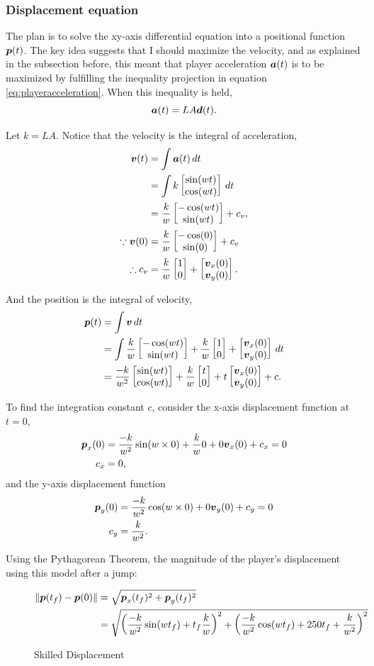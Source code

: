 \subsubsection{Displacement equation}
The plan is to solve the xy-axis differential equation into a positional function $\boldsymbol{p}(t)$. The key idea suggests that I should maximize the velocity, and as explained in the subsection before, this meant that player acceleration $\boldsymbol{a}(t)$ is to be maximized by fulfilling the inequality projection in equation \ref{eq:playeracceleration}. When this inequality is held,
\[
    \boldsymbol{a}(t) = LA\boldsymbol{d}(t).
\]

Let $k=LA$. Notice that the velocity is the integral of acceleration,
\begin{align*}
    \boldsymbol{v}(t) &= \int \boldsymbol{a}(t) \, dt\\
    &= \int k \begin{bmatrix}\sin(wt)\\\cos(wt)\end{bmatrix} \, dt\\
    &= \frac{k}{w} \begin{bmatrix}-\cos(wt)\\\sin(wt)\end{bmatrix} + c_v,\\
    \because \boldsymbol{v}(0) &= \frac{k}{w} \begin{bmatrix}-\cos(0)\\\sin(0)\end{bmatrix} + c_v\\
    \therefore c_v &= \frac{k}{w} \begin{bmatrix}1\\0\end{bmatrix} + \begin{bmatrix}\boldsymbol{v}_x(0)\\\boldsymbol{v}_y(0)\end{bmatrix}.
\end{align*}

And the position is the integral of velocity,
\begin{align*}
    \boldsymbol{p}(t) &= \int \boldsymbol{v} \, dt\\
    &= \int \frac{k}{w} \begin{bmatrix}-\cos(wt)\\\sin(wt)\end{bmatrix} + \frac{k}{w}\begin{bmatrix}1\\0\end{bmatrix} + \begin{bmatrix}\boldsymbol{v}_x(0)\\\boldsymbol{v}_y(0)\end{bmatrix} \, dt\\
    &= \frac{-k}{w^2} \begin{bmatrix}\sin(wt)\\\cos(wt)\end{bmatrix} + \frac{k}{w}\begin{bmatrix}t\\0\end{bmatrix}  + t\begin{bmatrix}\boldsymbol{v}_x(0)\\\boldsymbol{v}_y(0)\end{bmatrix} + c.
\end{align*}

To find the integration constant $c$, consider the x-axis displacement function at $t=0$,
\begin{align*}
    \boldsymbol{p}_x(0) &= \frac{-k}{w^2} \sin(w \times 0) + \frac{k}{w}0 + 0\boldsymbol{v}_x(0) + c_x = 0\\
    c_x &= 0,
\end{align*}
and the y-axis displacement function
\begin{align*}
    \boldsymbol{p}_y(0) &= \frac{-k}{w^2} \cos(w \times 0) + 0\boldsymbol{v}_y(0) + c_y = 0\\
    c_y &= \frac{k}{w^2}.
\end{align*}

Using the Pythagorean Theorem, the magnitude of the player's displacement using this model after a jump:
\begin{figure}[H]
    \centering
    \begin{align*}
        \|\boldsymbol{p}(t_f) - \boldsymbol{p}(0)\| &= \sqrt{\boldsymbol{p}_x(t_f)^2 + \boldsymbol{p}_y(t_f)^2}\\
        &= \sqrt{\left(\frac{-k}{w^2}\sin(wt_f) + t_f\frac{k}{w} \right)^2 + \left( \frac{-k}{w^2}\cos(wt_f) + 250t_f + \frac{k}{w^2} \right)^2}
    \end{align*}
    \caption{Skilled Displacement}
    \label{eq:2skilled_displacement}

\end{figure}

